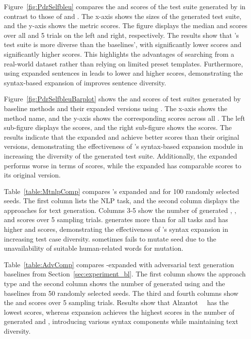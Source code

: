 Figure~\ref{fig:PdrSelfbleu} compares the \selfbleu and \pdr scores of the test suite generated by \tool in contrast to those of \Cklst and \hck.
The x-axis shows the sizes of the generated test suite, and the y-axis shows the metric scores.
The figure displays the median \selfbleu and \pdr scores over all \lcs and 5 trials on the left and right, respectively. The results show that \tool's test suite is more diverse than the baselines', with significantly lower \pdr scores and significantly higher \selfbleu scores. This highlights the advantages of searching from a real-world dataset rather than relying on limited preset templates. Furthermore, using expanded sentences in \tool leads to lower \selfbleu and higher \pdr scores, demonstrating the syntax-based expansion of \tool improves sentence diversity.

Figure~\ref{fig:PdrSelfbleuBarplot} shows the \selfbleu and \pdr scores of test suites generated by baseline methods and their expanded versions using \tool. The x-axis shows the method name, and the y-axis shows the corresponding scores across all \lcs. The left sub-figure displays the \selfbleu scores, and the right sub-figure shows the \pdr scores. The results indicate that the expanded \Cklst and \hck achieve better \pdr scores than their original versions, demonstrating the effectiveness of \tool's syntax-based expansion module in increasing the diversity of the generated test suite. Additionally, the expanded \Cklst performs worse in terms of \selfbleu scores, while the expanded \hck has comparable scores to its original version.

Table~\ref{table:MtnlpComp} compares \tool's expanded \sents and \mtnlp for 100 randomly selected seeds. The first column lists the NLP task, and the second column displays the approaches for text generation. Columns 3-5 show the number of generated \sents, \selfbleu, and \pdr scores over 5 sampling trials. \tool generates more \sents than \mtnlp for all tasks and has higher \selfbleu and \pdr scores, demonstrating the effectiveness of \tool's syntax expansion in increasing test case diversity. \mtnlp sometimes fails to mutate seed \sents due to the unavailability of suitable human-related words for mutation.

Table~\ref{table:AdvComp} compares \tool-expanded \sents with adversarial text generation baselines from Section~\ref{sec:experiment_bl}. The first column shows the approach type and the second column shows the number of generated \sents using \tool and the baselines from 50 randomly selected seeds. The third and fourth columns show the \selfbleu and \pdr scores over 5 sampling trials. Results show that Alzantot~\etal~\cite{alzantot2018genadvexp} has the lowest \selfbleu scores, whereas \tool expansion achieves the highest scores in the number of generated \sents and \pdr, introducing various syntax components while maintaining text diversity.



